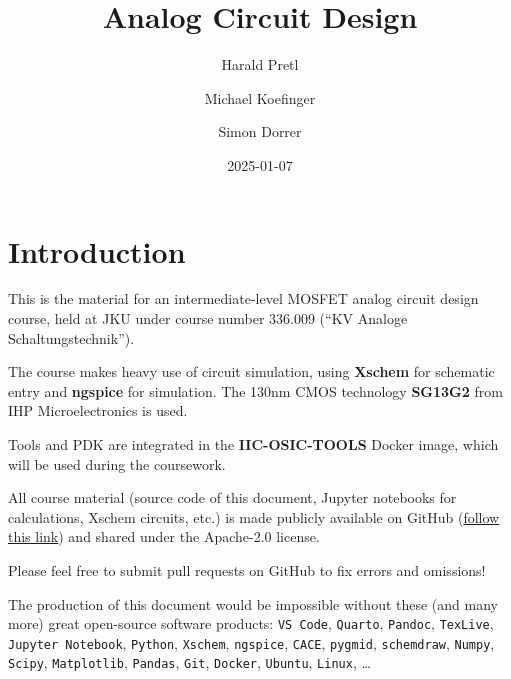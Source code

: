 \documentclass[
  a4paper,
  DIV=11,
  numbers=noendperiod]{scrartcl}
\title{Analog Circuit Design}
\author{Harald Pretl \and Michael Koefinger \and Simon Dorrer}
\date{2025-01-07}
\renewcommand*\contentsname{Table of contents}
\newcommand\contentsname{Table of contents}
\begin{document}
\maketitle

\renewcommand*\contentsname{Table of contents}
{
\hypersetup{linkcolor=}
\setcounter{tocdepth}{3}
\tableofcontents
}

\section{Introduction}\label{sec-intro}

This is the material for an intermediate-level MOSFET analog circuit
design course, held at JKU under course number 336.009 (``KV Analoge
Schaltungstechnik'').

The course makes heavy use of circuit simulation, using \textbf{Xschem}
for schematic entry and \textbf{ngspice} for simulation. The 130nm CMOS
technology \textbf{SG13G2} from IHP Microelectronics is used.

Tools and PDK are integrated in the \textbf{IIC-OSIC-TOOLS} Docker
image, which will be used during the coursework.

\begin{tcolorbox}[enhanced jigsaw, breakable, opacitybacktitle=0.6, arc=.35mm, coltitle=black, toprule=.15mm, colback=white, leftrule=.75mm, bottomrule=.15mm, left=2mm, colframe=quarto-callout-important-color-frame, colbacktitle=quarto-callout-important-color!10!white, titlerule=0mm, title=\textcolor{quarto-callout-important-color}{\faExclamation}\hspace{0.5em}{Important}, rightrule=.15mm, bottomtitle=1mm, toptitle=1mm, opacityback=0]

All course material (source code of this document, Jupyter notebooks for
calculations, Xschem circuits, etc.) is made publicly available on
GitHub (\href{https://github.com/iic-jku/analog-circuit-design}{follow
this link}) and shared under the Apache-2.0 license.

Please feel free to submit pull requests on GitHub to fix errors and
omissions!

The production of this document would be impossible without these (and
many more) great open-source software products: \texttt{VS\ Code},
\texttt{Quarto}, \texttt{Pandoc}, \texttt{TexLive},
\texttt{Jupyter\ Notebook}, \texttt{Python}, \texttt{Xschem},
\texttt{ngspice}, \texttt{CACE}, \texttt{pygmid}, \texttt{schemdraw},
\texttt{Numpy}, \texttt{Scipy}, \texttt{Matplotlib}, \texttt{Pandas},
\texttt{Git}, \texttt{Docker}, \texttt{Ubuntu}, \texttt{Linux}, \ldots{}

\end{tcolorbox}
\end{document}
